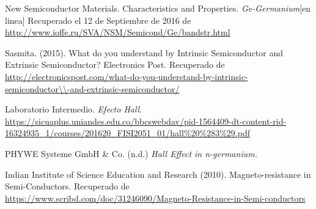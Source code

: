 \documentclass[twocolumn,showkeys,preprintnumbers,amsmath,amssymb]{revtex4}
\begin{document}
\begin{thebibliography}{99}

 New Semiconductor Materials. Characteristics and Properties. \textit{Ge-Germanium}[en linea] Recuperado el 12 de Septiembre de 2016 de \url{http://www.ioffe.ru/SVA/NSM/Semicond/Ge/bandstr.html}

 Sasmita. (2015). What do you understand by Intrinsic Semiconductor and Extrinsic Semiconductor? Electronics Post. Recuperado de \url{http://electronicspost.com/what-do-you-understand-by-intrinsic-semiconductor\\-and-extrinsic-semiconductor/}

 Laboratorio Intermedio. \textit{Efecto Hall}. \url{https://sicuaplus.uniandes.edu.co/bbcswebdav/pid-1564409-dt-content-rid-16324935_1/courses/201620_FISI2051_01/hall%20%283\%29.pdf}
	
 PHYWE Systeme GmbH \& Co. (n.d.) \textit{Hall Effect in n-germanium.}

 Indian Institute of Science Education and Research (2010). Magneto-resistance in Semi-Conductors. Recuperado de \url{https://www.scribd.com/doc/31246090/Magneto-Resistance-in-Semi-conductors}

\end{thebibliography}
\end{document}

